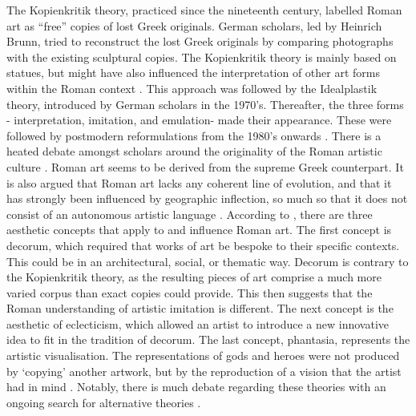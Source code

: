 	The Kopienkritik theory, practiced since the nineteenth century, labelled Roman art as “free” copies of lost Greek originals. German scholars, led by Heinrich Brunn, tried to reconstruct the lost Greek originals by comparing photographs with the existing sculptural copies. The Kopienkritik theory is mainly based on statues, but might have also influenced the interpretation of other art forms within the Roman context \parencites{Perry_2005}[4--6]{Gazda_2002}. This approach was followed by the Idealplastik theory, introduced by German scholars in the 1970’s. Thereafter, the three forms - interpretation, imitation, and emulation- made their appearance. These were followed by postmodern reformulations from the 1980’s onwards \parencite[7--9]{Gazda_2002} . 
	There is a heated debate amongst scholars around the originality of the Roman artistic culture \parencite {LaRocca_2010}. Roman art seems to be derived from the supreme Greek counterpart. It is also argued that Roman art lacks any coherent line of evolution, and that it has strongly been influenced by geographic inflection, so much so that it does not consist of an autonomous artistic language \parencite [344--345] {LaRocca_2010}. 
	According to \textcite{Perry_2005}, there are three aesthetic concepts that apply to and influence Roman art. The first concept is decorum, which required that works of art be bespoke to their specific contexts. This could be in an architectural, social, or thematic way. Decorum is contrary to the Kopienkritik theory, as the resulting pieces of art comprise a much more varied corpus than exact copies could provide.
This then suggests that the Roman understanding of artistic imitation is different. The next concept is the aesthetic of eclecticism, which allowed an artist to introduce a new innovative idea to fit in the tradition of decorum. The last concept, phantasia, represents the artistic visualisation. The representations of gods and heroes were not produced by ‘copying’ another artwork, but by the reproduction of a vision that the artist had in mind \parencite {Perry_2005}. Notably, there is much debate regarding these theories with an ongoing search for alternative theories \parencite [16]{Gazda_2002}. 
	
